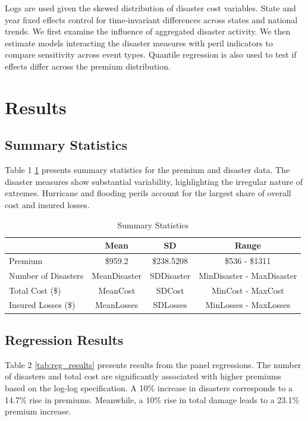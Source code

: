 \documentclass[12pt]{article}
\begin{document}
Logs are used given the skewed distribution of disaster cost variables. State and year fixed effects control for time-invariant 
differences across states and national trends. We first examine the influence of aggregated disaster activity. We then estimate 
models interacting the disaster measures with peril indicators to compare sensitivity across event types. Quantile regression is 
also used to test if effects differ across the premium distribution.



\section{Results}
\label{sec:resu}
\subsection{Summary Statistics}
Table 1 \ref{tab:summary} presents summary statistics for the premium and disaster data. The disaster measures show substantial variability, 
highlighting the irregular nature of extremes. Hurricane and flooding perils account for the largest share of overall cost and 
insured losses.

\begin{table}[h]
    \label{tab:summary}
    \centering
    \begin{tabular}{|l|c|c|c|}
        \hline
        & Mean & SD & Range \\
        \hline
        Premium & \$\num{959.2} & \$\num{238.5208} & \$\num{536} - \$\num{1311} \\
        Number of Disasters & MeanDisaster & SDDisaster & MinDisaster - MaxDisaster \\
        Total Cost (\$) & MeanCost & SDCost & MinCost - MaxCost \\
        Insured Losses (\$) & MeanLosses & SDLosses & MinLosses - MaxLosses \\
        \hline
    \end{tabular}
    \caption{Summary Statistics}
    \cite{statista,ncai,fema}
\end{table}

\subsection{Regression Results}
Table 2 \ref{tab:reg_results} presents results from the panel regressions. The number of disasters and total cost are significantly associated with 
higher premiums based on the log-log specification. A 10\% increase in disasters corresponds to a 14.7\% rise in premiums. Meanwhile, 
a 10\% rise in total damage leads to a 23.1\% premium increase.
\end{document}
